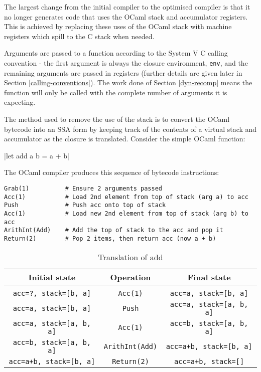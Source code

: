 The largest change from the initial compiler to the optimised compiler is that it no longer
generates
code that uses the OCaml stack and accumulator registers. This is achieved by replacing these uses
of the OCaml stack with machine registers which spill to the C stack when needed.

Arguments are passed to a function according to the System V C calling convention - the first
argument is always the closure environment, \texttt{env}, and the remaining arguments are passed
in registers (further details are given later in Section \ref{calling-conventions}). The work done
of Section \ref{dyn-recomp} means the function will only be called with the complete number of
arguments it is expecting.

The method used to remove the use of the stack is to convert the OCaml bytecode into an SSA form
by keeping track of the contents of a virtual stack and accumulator as the closure is translated.
Consider the simple OCaml function:

|let add a b = a + b|

The OCaml compiler produces this sequence of bytecode instructions:

\begin{verbatim}
Grab(1)          # Ensure 2 arguments passed
Acc(1)           # Load 2nd element from top of stack (arg a) to acc
Push             # Push acc onto top of stack
Acc(1)           # Load new 2nd element from top of stack (arg b) to acc
ArithInt(Add)    # Add the top of stack to the acc and pop it
Return(2)        # Pop 2 items, then return acc (now a + b)
\end{verbatim}

\begin{table}[h]
      \centering
      \begin{tabular}{ccc}\toprule
            Initial state                   & Operation              & Final state
            \\
            \midrule
            \\
            \texttt{acc=?, stack=[b, a]}    & \texttt{Acc(1)}        & \texttt{acc=a, stack=[b, a]}
            \\
            \texttt{acc=a, stack=[b, a]}    & \texttt{Push}          & \texttt{acc=a, stack=[a, b,
                              a]}
            \\
            \texttt{acc=a, stack=[a, b, a]} & \texttt{Acc(1)}        & \texttt{acc=b, stack=[a, b,
                              a]}
            \\
            \texttt{acc=b, stack=[a, b, a]} & \texttt{ArithInt(Add)} & \texttt{acc=a+b, stack=[b,
                              a]}
            \\
            \texttt{acc=a+b, stack=[b, a]}  & \texttt{Return(2)}     & \texttt{acc=a+b, stack=[]}
            \\
            \bottomrule
      \end{tabular}

      \caption{Translation of add}
      \label{table:stacktrans}
\end{table}

